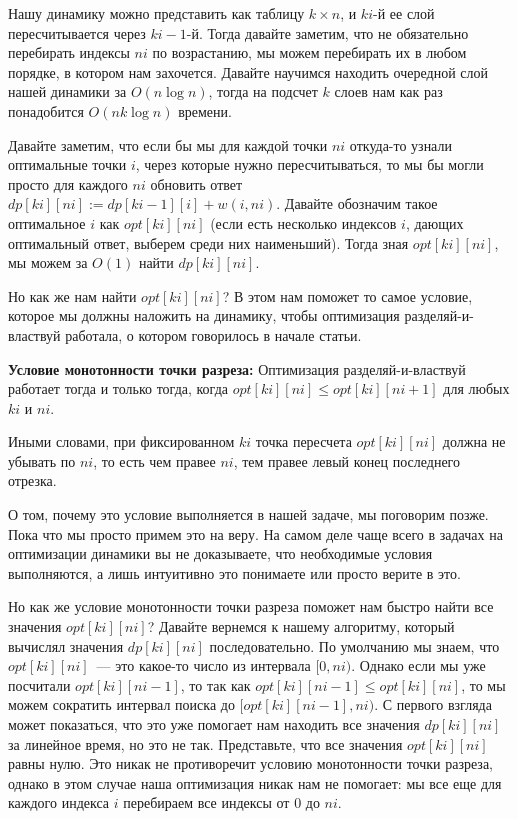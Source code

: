 Нашу динамику можно представить как таблицу $k \times n$, и $ki$-й ее слой пересчитывается через $ki-1$-й. Тогда давайте заметим, что не обязательно перебирать индексы $ni$ по возрастанию, мы можем перебирать их в любом порядке, в котором нам захочется. Давайте научимся находить очередной слой нашей динамики за $O(n \log n)$, тогда на подсчет $k$ слоев нам как раз понадобится $O(n k \log n)$ времени.

Давайте заметим, что если бы мы для каждой точки $ni$ откуда-то узнали оптимальные точки $i$, через которые нужно пересчитываться, то мы бы могли просто для каждого $ni$ обновить ответ $dp[ki][ni] := dp[ki - 1][i] + w(i, ni)$. Давайте обозначим такое оптимальное $i$ как $opt[ki][ni]$ (если есть несколько индексов $i$, дающих оптимальный ответ, выберем среди них наименьший). Тогда зная $opt[ki][ni]$, мы можем за $O(1)$ найти $dp[ki][ni]$.

Но как же нам найти $opt[ki][ni]$? В этом нам поможет то самое условие, которое мы должны наложить на динамику, чтобы оптимизация разделяй-и-властвуй работала, о котором говорилось в начале статьи.

\textbf{Условие монотонности точки разреза:} Оптимизация разделяй-и-властвуй работает тогда и только тогда, когда $opt[ki][ni] \le opt[ki][ni + 1]$ для любых $ki$ и $ni$.

Иными словами, при фиксированном $ki$ точка пересчета $opt[ki][ni]$ должна не убывать по $ni$, то есть чем правее $ni$, тем правее левый конец последнего отрезка.

О том, почему это условие выполняется в нашей задаче, мы поговорим позже. Пока что мы просто примем это на веру. На самом деле чаще всего в задачах на оптимизации динамики вы не доказываете, что необходимые условия выполняются, а лишь интуитивно это понимаете или просто верите в это.

Но как же условие монотонности точки разреза поможет нам быстро найти все значения $opt[ki][ni]$? Давайте вернемся к нашему алгоритму, который вычислял значения $dp[ki][ni]$ последовательно. По умолчанию мы знаем, что $opt[ki][ni]$~--- это какое-то число из интервала $[0, ni)$. Однако если мы уже посчитали $opt[ki][ni - 1]$, то так как $opt[ki][ni - 1] \le opt[ki][ni]$, то мы можем сократить интервал поиска до $[opt[ki][ni - 1], ni)$. С первого взгляда может показаться, что это уже помогает нам находить все значения $dp[ki][ni]$ за линейное время, но это не так. Представьте, что все значения $opt[ki][ni]$ равны нулю. Это никак не противоречит условию монотонности точки разреза, однако в этом случае наша оптимизация никак нам не помогает: мы все еще для каждого индекса $i$ перебираем все индексы от $0$ до $ni$.

